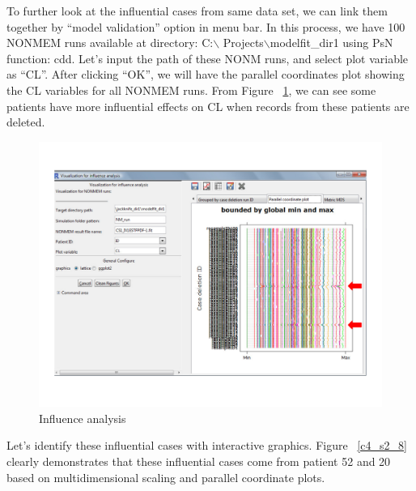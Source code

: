 \documentclass[a4paper]{article}
\begin{document}
\newline
\newline
To further look at the influential cases from same data set, we can link them together by ``model validation'' option in menu bar. In this process, we have 100 NONMEM runs available at directory: C:$\backslash$ Projects$\backslash$modelfit\_dir1 using PsN function: cdd. Let's input the path of these NONM runs, and select plot variable as ``CL''. After clicking ``OK'', we will have the parallel coordinates plot showing the CL variables for all NONMEM runs. From Figure ~\ref{c4_s2_7}, we can see some patients have more influential effects on CL when records from these patients are deleted.
\begin{figure}[h!tb]
\centering
\includegraphics[scale=0.6]{c4_s2_7.pdf}
\caption{Influence analysis}
\label{c4_s2_7}
\end{figure}
\newline
\newline
Let's identify these influential cases with interactive graphics. Figure ~\ref{c4_s2_8} clearly demonstrates that these influential cases come from patient 52 and 20 based on multidimensional scaling and parallel coordinate plots.
\end{document}
